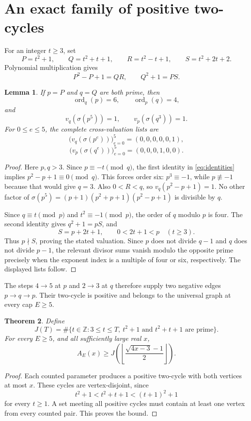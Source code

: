 \documentclass[11pt]{article}
\newtheorem{theorem}{Theorem}[section]
\newtheorem{lemma}[theorem]{Lemma}
\DeclareMathOperator{\ord}{ord}
\begin{document}
\section{An exact family of positive two-cycles}
For an integer $t\ge3$, set
\[
 P=t^2+1,\qquad Q=t^2+t+1,\qquad R=t^2-t+1,\qquad S=t^2+2t+2.
\]
Polynomial multiplication gives
\begin{equation}\label{eq:identities}
 \boxed{P^2-P+1=QR,\qquad Q^2+1=PS.}
\end{equation}

\begin{lemma}\label{lem:orders}
If $p=P$ and $q=Q$ are both prime, then
\[
 \ord_q(p)=6,\qquad \ord_p(q)=4,
\]
and
\[
 v_q(\sigma(p^5))=1,\qquad v_p(\sigma(q^3))=1.
\]
For $0\le e\le5$, the complete cross-valuation lists are
\[
 \bigl(v_q(\sigma(p^e))\bigr)_{e=0}^{5}=(0,0,0,0,0,1),
\]
\[
 \bigl(v_p(\sigma(q^e))\bigr)_{e=0}^{5}=(0,0,0,1,0,0).
\]
\end{lemma}
\begin{proof}
Here $p,q>3$. Since $p\equiv-t\pmod q$, the first identity in \eqref{eq:identities} implies $p^2-p+1\equiv0\pmod q$. This forces order six: $p^3\equiv-1$, while $p\not\equiv-1$ because that would give $q=3$. Also $0<R<q$, so $v_q(p^2-p+1)=1$. No other factor of $\sigma(p^5)=(p+1)(p^2+p+1)(p^2-p+1)$ is divisible by $q$.

Since $q\equiv t\pmod p$ and $t^2\equiv-1\pmod p$, the order of $q$ modulo $p$ is four. The second identity gives $q^2+1=pS$, and
\[
 S=p+2t+1,\qquad 0<2t+1<p\quad(t\ge3).
\]
Thus $p\nmid S$, proving the stated valuation. Since $p$ does not divide $q-1$ and $q$ does not divide $p-1$, the relevant divisor sums vanish modulo the opposite prime precisely when the exponent index is a multiple of four or six, respectively. The displayed lists follow.
\end{proof}

The steps $4\to5$ at $p$ and $2\to3$ at $q$ therefore supply two negative edges $p\to q\to p$. Their two-cycle is positive and belongs to the universal graph at every cap $E\ge5$.

\begin{theorem}\label{thm:lower}
Define
\[
 J(T)=\#\{t\in\mathbb Z:3\le t\le T,\ t^2+1\text{ and }t^2+t+1\text{ are prime}\}.
\]
For every $E\ge5$, and all sufficiently large real $x$,
\begin{equation}\label{eq:lower}
 \boxed{A_E(x)\ge J\!\left(\left\lfloor\frac{\sqrt{4x-3}-1}{2}\right\rfloor\right).}
\end{equation}
\end{theorem}
\begin{proof}
Each counted parameter produces a positive two-cycle with both vertices at most $x$. These cycles are vertex-disjoint, since
\[
 t^2+1<t^2+t+1<(t+1)^2+1
\]
for every $t\ge1$. A set meeting all positive cycles must contain at least one vertex from every counted pair. This proves the bound.
\end{proof}
\end{document}
